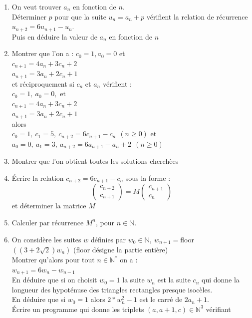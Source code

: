 \documentclass[a4paper,11pt]{book}
\newcommand{\N}{{\mathbb{N}}}
\begin{document}
\begin{enumerate}
Puis en d\'eduire la valeur de $c_n$ en fonction de $n$.
\item On veut trouver $a_n$  en fonction de $n$.\\
D\'eterminer $p$ pour que la suite $u_n=a_n+p$ v\'erifient la 
relation de r\'ecurrence $u_{n+2}=6u_{n+1}-u_n$.\\
Puis en d\'eduire la valeur de $a_n$ en fonction de $n$
\item Montrer que l'on a :
$c_0=1,a_0=0$ et\\
$c_{n+1}=4a_n+3c_n+2$\\
$a_{n+1}=3a_n+2c_n+1$\\
et r\'eciproquement si $c_n$ et $a_n$ v\'erifient :\\
$c_0=1,\ a_0=0,$ et\\
$c_{n+1}=4a_n+3c_n+2$\\
$a_{n+1}=3a_n+2c_n+1$\\
alors \\
$c_0=1,\ c_1=5,\ c_{n+2}=6c_{n+1}-c_n\ \  (n\geq 0)$ et\\
$a_0=0,\ a_1=3,\ a_{n+2}=6a_{n+1}-a_n+2\ \  (n\geq 0)$\\
\item Montrer que l'on obtient toutes les solutions cherch\`ees
\item \'Ecrire la relation $c_{n+2}=6c_{n+1}-c_n$ sous la forme :
$$
\left(
\begin{array}{c}
c_{n+2}\\
c_{n+1}
\end{array}
\right)
=M
\left(
\begin{array}{c}
c_{n+1}\\
c_n
\end{array}
\right)$$
et d\'eterminer la matrice $M$
\item Calculer par r\'ecurrence $M^n$, pour $n\in \N$.
\item On consid\`ere les suites $w$ d\'efinies par
$w_0\in \N,\ w_{n+1}=$floor$((3+2\sqrt 2)w_n)$ (floor d\'esigne la 
partie enti\`ere)\\
Montrer qu'alors pour tout $n\in \N^*$ on a :\\
$w_{n+1}=6w_n-w_{n-1}$\\
En d\'eduire que si on choisit $w_0=1$ la suite $w_n$ est la suite  
$c_n$ qui donne la longueur des hypot\'enuse des triangles rectangles presque 
isoc\`eles.\\
En d\'eduire que si $w_0=1$ alors $2*w_n^2-1$ est le carr\'e de 
$2a_n+1$.\\
\'Ecrire un programme qui donne les triplets $(a,a+1,c)\in \N^3$ v\'erifiant 

\end{enumerate}
\end{document}
